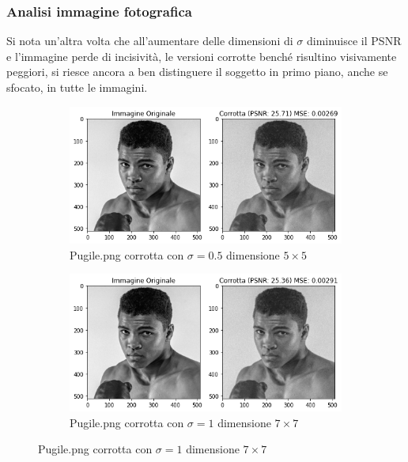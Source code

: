 \subsubsection{Analisi immagine fotografica}
Si nota un'altra volta che all'aumentare delle dimensioni di $\sigma$ diminuisce il PSNR e l'immagine perde di 
incisività, le versioni corrotte benché risultino visivamente peggiori, si riesce ancora a ben distinguere il 
soggetto in primo piano, anche se sfocato, in tutte le immagini. 

\begin{figure}[H]
    \centering
    \begin{subfigure}{0.6\textwidth}
        \centering
        \includegraphics[width=\textwidth]{imgRel/muhammedcorrotto/muhammedcorrotto5x5.png}
        \caption{Pugile.png corrotta con $\sigma = 0.5$ dimensione $5 \times 5$}
        \label{fig: pugilecorrotto5}
    \end{subfigure}
    \begin{subfigure}{0.6\textwidth}
        \centering
        \includegraphics[width=\textwidth]{imgRel/muhammedcorrotto/muhammedcorrotto7x7.png}
        \caption{Pugile.png corrotta con $\sigma = 1$ dimensione $7 \times 7$}
        \label{fig: pugilecorrotto7}
    \end{subfigure}

\end{figure}
